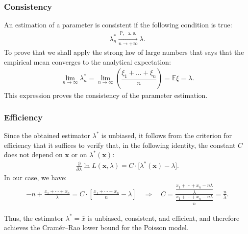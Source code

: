 \documentclass[final,3p,times,onecolumn]{elsarticle}
\begin{document}
\subsubsection{Consistency}
An estimation of a parameter is consistent if the following condition is true: 
\begin{gather*}
\lambda^*_n \xrightarrow[n \to + \infty]{\mathbb{P}, \ \text{ a. s.}} \lambda.
\end{gather*}
To prove that we shall apply the strong law of large numbers that says that the empirical mean
converges to the analytical expectation: 
\begin{gather*}
\lim\limits_{n \to \infty}\lambda^*_n = \lim\limits_{n \to \infty}  \left(\dfrac{\xi_1 + \ldots + \xi_n}{n}\right) = \mathbb{E}\xi = \lambda.
\end{gather*}
This expression proves the consistency of the parameter estimation.

\subsubsection{Efficiency}

Since the obtained estimator $\lambda^*$ is unbiased, it follows from the criterion for efficiency that it suffices to verify that, in the following identity, the constant $C$ does not depend on $\mathbf{x}$ or on $\lambda^*(\mathbf{x})$:
\begin{gather*}
\frac{\partial}{\partial \lambda} \ln L(\mathbf{x}, \lambda) = C \cdot \bigl[\lambda^*(\mathbf{x}) - \lambda\bigr].
\end{gather*}
In our case, we have:
\begin{gather*}
-n + \frac{x_1 + \cdots + x_n}{\lambda}
= C \cdot \left[\frac{x_1 + \cdots + x_n}{n} - \lambda \right]
\quad
\Longrightarrow
\quad
C =
\frac{\dfrac{x_1 + \cdots + x_n - n\lambda}{\lambda}}
{\dfrac{x_1 + \cdots + x_n - n\lambda}{n}}
= \frac{n}{\lambda}.
\end{gather*}

Thus, the estimator $\lambda^* = \bar{x}$ is unbiased, consistent, and efficient, and therefore achieves the Cramér–Rao lower bound for the Poisson model.
\end{document}
